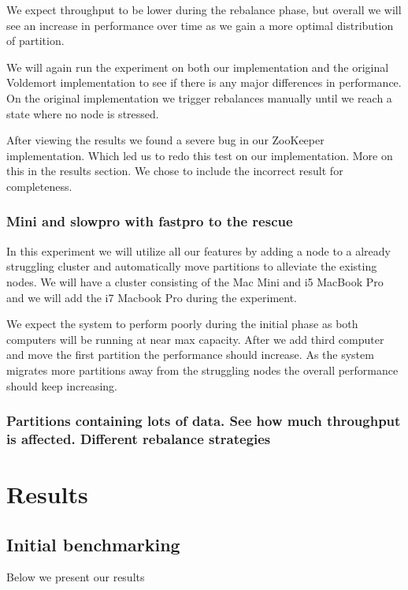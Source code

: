 We expect throughput to be lower during the rebalance phase, but overall we will see an increase in performance over time as we gain a more optimal distribution of partition. 

We will again run the experiment on both our implementation and the original Voldemort implementation to see if there is any major differences in performance. On the original implementation we trigger rebalances manually until we reach a state where no node is stressed. 

After viewing the results we found a severe bug in our ZooKeeper implementation. Which led us to redo this test on our implementation. More on this in the results section. We chose to include the incorrect result for completeness. 


\subsubsection{Mini and slowpro with fastpro to the rescue}
In this experiment we will utilize all our features by adding a node to a already struggling cluster and automatically move partitions to alleviate the existing nodes. We will have a cluster consisting of the Mac Mini and i5 MacBook Pro and we will add the i7 Macbook Pro during the experiment. 

We expect the system to perform poorly during the initial phase as both computers will be running at near max capacity. After we add third computer and move the first partition the performance should increase. As the system migrates more partitions away from the struggling nodes the overall performance should keep increasing. 

\subsubsection{Partitions containing lots of data. See how much throughput is affected. Different rebalance strategies}





\section{Results}

\subsection{Initial benchmarking}
Below we present our results


